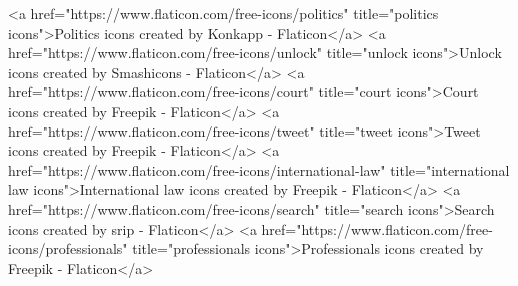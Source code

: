 <a href="https://www.flaticon.com/free-icons/politics" title="politics icons">Politics icons created by Konkapp - Flaticon</a>
<a href="https://www.flaticon.com/free-icons/unlock" title="unlock icons">Unlock icons created by Smashicons - Flaticon</a>
<a href="https://www.flaticon.com/free-icons/court" title="court icons">Court icons created by Freepik - Flaticon</a>
<a href="https://www.flaticon.com/free-icons/tweet" title="tweet icons">Tweet icons created by Freepik - Flaticon</a>
<a href="https://www.flaticon.com/free-icons/international-law" title="international law icons">International law icons created by Freepik - Flaticon</a>
<a href="https://www.flaticon.com/free-icons/search" title="search icons">Search icons created by srip - Flaticon</a>
<a href="https://www.flaticon.com/free-icons/professionals" title="professionals icons">Professionals icons created by Freepik - Flaticon</a>